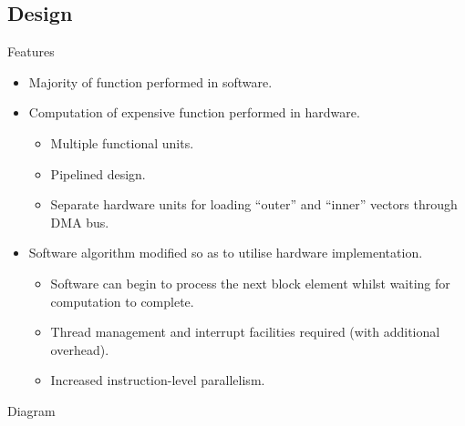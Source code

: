 \subsection{Design}
\begin{frame}[label=design]{Features}
    \begin{itemize}
        \item Majority of  function performed
            in software.

        \item Computation of expensive  function
            performed in hardware.
        \begin{itemize}
            \item Multiple functional units.
            \item Pipelined design.
            \item Separate hardware units for loading ``outer'' and ``inner''
                vectors through DMA bus.
        \end{itemize}

        \item Software algorithm modified so as to utilise hardware
            implementation.
        \begin{itemize}
            \item Software can begin to process the next block element whilst
                waiting for  computation to complete.
            \item Thread management and interrupt facilities required (with
                additional overhead).
            \item Increased instruction-level parallelism.
        \end{itemize}
    \end{itemize}
\end{frame}

\begin{frame}[label=design-diagram]{Diagram}
\end{frame}

